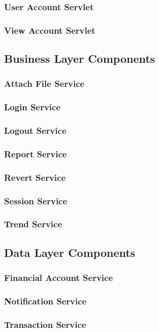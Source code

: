 \documentclass{article}
\begin{document}
\subsubsection{User Account Servlet}
\subsubsection{View Account Servlet}
\subsection{Business Layer Components}
\subsubsection{Attach File Service}
\subsubsection{Login Service}
\subsubsection{Logout Service}
\subsubsection{Report Service}
\subsubsection{Revert Service}
\subsubsection{Session Service}
\subsubsection{Trend Service}
\subsection{Data Layer Components}
\subsubsection{Financial Account Service}
\subsubsection{Notification Service}
\subsubsection{Transaction Service}
\end{document}

